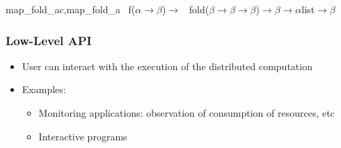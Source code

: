 \documentclass[xcolor=dvipsnames]{beamer}
\begin{document}
\begin{frame}
\medskip\noindent
{\colorbox{tmpcolor}{\begin{minipage}{\textwidth}\ttfamily\parindent 0pt

\noindent{}\hspace*{1.22ex}map\_{}fold\_{}ac,\hspace*{1.22ex}map\_{}fold\_{}a~\linebreak
\noindent\hspace*{1.00em}f\hspace*{1.22ex}(\ensuremath{\alpha}\hspace*{1.22ex}\ensuremath{\rightarrow}\hspace*{1.22ex}\ensuremath{\beta})\hspace*{1.22ex}\ensuremath{\rightarrow}\hspace*{1.22ex}~\linebreak
\noindent\hspace*{1.00em}fold\hspace*{1.22ex}(\ensuremath{\beta}\hspace*{1.22ex}\ensuremath{\rightarrow}\hspace*{1.22ex}\ensuremath{\beta}\hspace*{1.22ex}\ensuremath{\rightarrow}\hspace*{1.22ex}\ensuremath{\beta})\hspace*{1.22ex}\ensuremath{\rightarrow}\hspace*{1.22ex}\ensuremath{\beta}\hspace*{1.22ex}\ensuremath{\rightarrow}\hspace*{1.22ex}\ensuremath{\alpha}\hspace*{1.22ex}list\hspace*{1.22ex}\ensuremath{\rightarrow}\hspace*{1.22ex}\ensuremath{\beta}
\end{minipage}}}


\medskip\noindent
\end{frame}


\begin{frame}\frametitle {Low-Level API}
  \begin{itemize}
  \item User can interact with the execution of the distributed
    computation


\bigskip
  \item Examples:
    \begin{itemize}
    \item Monitoring applications: observation of consumption of
      resources, etc
    \item Interactive programs
    \end{itemize}
  \end{itemize}
\end{frame}
\end{document}
